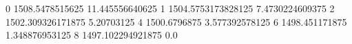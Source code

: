 0 1508.5478515625 11.445556640625
1 1504.5753173828125 7.4730224609375
2 1502.309326171875 5.20703125
4 1500.6796875 3.577392578125
6 1498.451171875 1.348876953125
8 1497.102294921875 0.0
